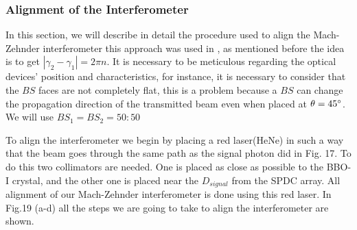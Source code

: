 \documentclass[12pt]{book}
\begin{document}
\subsubsection{Alignment of the Interferometer}

In this section, we will describe in detail the procedure used to align the Mach-Zehnder interferometer this approach was used in \cite{zuri}, as mentioned before the idea is to get $|\gamma_{2}-\gamma_{1}|=2\pi n$. It is necessary to be meticulous regarding the optical devices' position and characteristics, for instance, it is necessary to consider that the $BS$ faces are not completely flat, this is a problem because a $BS$ can change the propagation direction of the transmitted beam even when placed at $\theta=45\degree$. We will use $BS_{1}=BS_{2}=50:50$

To align the interferometer we begin by placing a red laser(HeNe) in such a way that the beam goes through the same path as the signal photon did in Fig. 17. To do this two collimators are needed. One is placed as close as possible to the BBO-I crystal, and the other one is placed near the $D_{signal}$ from the SPDC array. All alignment of our Mach-Zehnder interferometer is done using this red laser. In Fig.19 (a-d) all the steps we are going to take to align the interferometer are shown.
\end{document}
